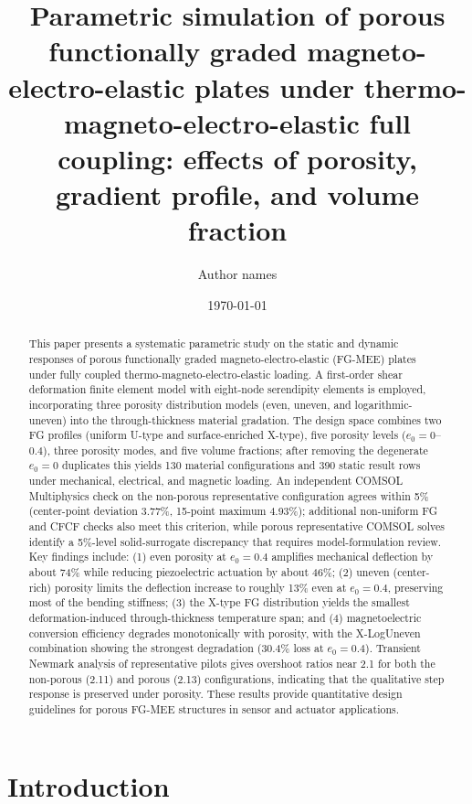 \documentclass[11pt,a4paper]{article}
\title{Parametric simulation of porous functionally graded magneto-electro-elastic plates under thermo-magneto-electro-elastic full coupling: effects of porosity, gradient profile, and volume fraction}
\author{Author names}
\date{\today}
\begin{document}
\maketitle

\begin{abstract}
This paper presents a systematic parametric study on the static and dynamic responses of porous functionally graded magneto-electro-elastic (FG-MEE) plates under fully coupled thermo-magneto-electro-elastic loading. A first-order shear deformation finite element model with eight-node serendipity elements is employed, incorporating three porosity distribution models (even, uneven, and logarithmic-uneven) into the through-thickness material gradation. The design space combines two FG profiles (uniform U-type and surface-enriched X-type), five porosity levels ($e_0 = 0$--$0.4$), three porosity modes, and five volume fractions; after removing the degenerate $e_0 = 0$ duplicates this yields 130 material configurations and 390 static result rows under mechanical, electrical, and magnetic loading. An independent COMSOL Multiphysics check on the non-porous representative configuration agrees within 5\% (center-point deviation 3.77\%, 15-point maximum 4.93\%); additional non-uniform FG and CFCF checks also meet this criterion, while porous representative COMSOL solves identify a 5\%-level solid-surrogate discrepancy that requires model-formulation review. Key findings include: (1) even porosity at $e_0 = 0.4$ amplifies mechanical deflection by about 74\% while reducing piezoelectric actuation by about 46\%; (2) uneven (center-rich) porosity limits the deflection increase to roughly 13\% even at $e_0 = 0.4$, preserving most of the bending stiffness; (3) the X-type FG distribution yields the smallest deformation-induced through-thickness temperature span; and (4) magnetoelectric conversion efficiency degrades monotonically with porosity, with the X-LogUneven combination showing the strongest degradation (30.4\% loss at $e_0 = 0.4$). Transient Newmark analysis of representative pilots gives overshoot ratios near 2.1 for both the non-porous (2.11) and porous (2.13) configurations, indicating that the qualitative step response is preserved under porosity. These results provide quantitative design guidelines for porous FG-MEE structures in sensor and actuator applications.
\end{abstract}

\section{Introduction}
\end{document}

